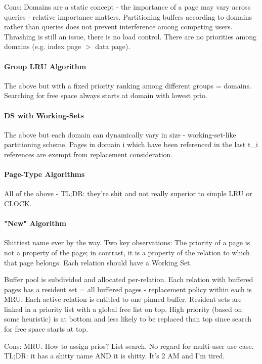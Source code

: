 Cons: Domains are a static concept - the importance of a page may vary across queries - relative importance matters. Partitioning buffers according to domains rather than queries does not prevent interference among competing users. Thrashing is still an issue, there is no load control. There are no priorities among domains (e.g. index page $>$ data page).

\paragraph{Group LRU Algorithm}
The above but with a fixed priority ranking among different groups = domains. Searching for free space always starts at domain with lowest prio.

\paragraph{DS with Working-Sets}
The above but each domain can dynamically vary in size - working-set-like partitioning scheme. Pages in domain i which have been referenced in the last t\_i references are exempt from replacement consideration.

\paragraph{Page-Type Algorithms}
All of the above - TL;DR: they're shit and not really superior to simple LRU or CLOCK.

\paragraph{"New" Algorithm}
Shittiest name ever by the way. Two key observations: The priority of a page is not a property of the page; in contrast, it is a property of the relation to
which that page belongs. Each relation should have a Working Set. 

Buffer pool is subdivided and allocated per-relation. Each relation with buffered pages has a resident set = all buffered pages - replacement policy within each is MRU. Each active relation is entitled to one pinned buffer. Resident sets are linked in a priority list with a global free list on top. High priority (based on some heuristic) is at bottom and less likely to be replaced than top since search for free space starts at top.

Cons: MRU. How to assign prios? List search. No regard for multi-user use case. TL;DR: it has a shitty name AND it is shitty. It's 2 AM and I'm tired.

